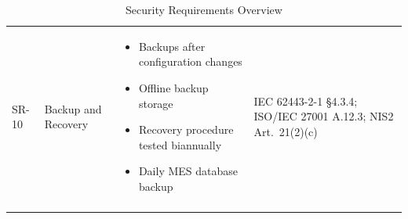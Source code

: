 \begin{longtable}{p{1.2cm} p{3.2cm} p{5.2cm} p{4.2cm}}
SR-10 & Backup and Recovery &
\begin{itemize}[leftmargin=*, noitemsep, topsep=2pt]
\item Backups after configuration changes
\item Offline backup storage
\item Recovery procedure tested biannually
\item Daily MES database backup
\end{itemize}
&
IEC 62443-2-1 §4.3.4; ISO/IEC 27001 A.12.3; NIS2 Art.~21(2)(c) \\

\caption{Security Requirements Overview}
\label{tab:security-requirements}

\end{longtable}